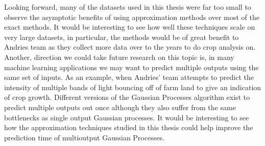 Looking forward, many of the datasets used in this thesis were far too small to observe the asymptotic benefits of using approximation methods over most of the exact methods. It would be interesting to see how well these techniques scale on very large datasets, in particular, the methods would be of great benefit to Andries team as they collect more data over to the years to do crop analysis on. Another, direction we could take future research on this topic is, in many machine learning applications we may want to predict multiple outputs using the same set of inputs. As an example, when Andries' team attempts to predict the intensity of multiple bands of light bouncing off of farm land to give an indication of crop growth. Different versions of the Gaussian Processes algorithm exist to predict multiple outputs out once although they also suffer from the same bottlenecks as single output Gaussian processes. It would be interesting to see how the approximation techniques studied in this thesis could help improve the prediction time of multioutput Gaussian Processes.